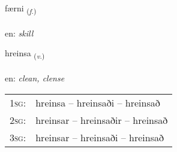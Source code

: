 \documentclass[frontgrid, backgrid]{flacards}\usepackage[]{graphicx}\usepackage[]{xcolor}
\begin{document}
\renewcommand{\flhead}{\vskip5pt \fboxsep=0pt {\small\bfseries\footnotesize Nafnorð | Noun}}
\renewcommand{\fcfoot}{\vskip5pt \fboxsep=0pt \hspace{2pt}{\small\bfseries\footnotesize 3K}}

\renewcommand{\blhead}{\vskip5pt {\small\bfseries\footnotesize Nafnorð | Noun }}
\renewcommand{\bcfoot}{\vskip5pt \hspace{2pt}{\small\bfseries\footnotesize 3K}}


{færni \small{\textsubscript{(\textit{f.})}} \\[1ex] %
\textphonetic{[fairtnɪ]} \\
en: \emph{skill} \\  [2ex]
\renewcommand*{\arraystretch}{0.8}
}

\renewcommand{\flhead}{\vskip5pt \fboxsep=0pt {\small\bfseries\footnotesize Sagnorð | Verb}}
\renewcommand{\fcfoot}{\vskip5pt \fboxsep=0pt \hspace{2pt}{\small\bfseries\footnotesize 3K}}

\renewcommand{\blhead}{\vskip5pt {\small\bfseries\footnotesize Sagnorð | Verb }}
\renewcommand{\bcfoot}{\vskip5pt \hspace{2pt}{\small\bfseries\footnotesize 3K}}


{hreinsa \small{\textsubscript{(\textit{v.})}} \\[1ex] %
\textphonetic{[r̥einsa]} \\
en: \emph{clean, clense} \\  [2ex]
\renewcommand*{\arraystretch}{0.8}
\begin{tabular}{p{1cm}l}
\textsc{1sg}: & hreinsa -- hreinsaði -- hreinsað \\ 
\textsc{2sg}: & hreinsar -- hreinsaðir -- hreinsað \\ 
\textsc{3sg}: & hreinsar -- hreinsaði -- hreinsað \\ 
\end{tabular}
}
\end{document}
